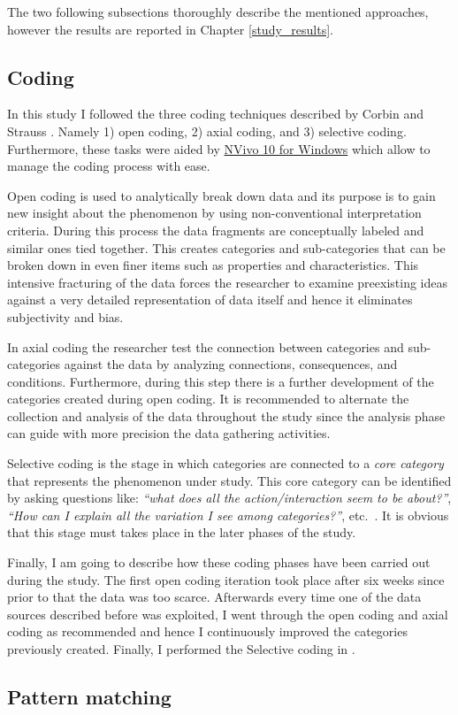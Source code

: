 The two following subsections thoroughly describe the mentioned approaches, however the results are reported in Chapter \ref{study_results}.

\subsection{Coding}
In this study I followed the three coding techniques described by Corbin and Strauss \cite{coding_guidelines}. Namely 1) open coding, 2) axial coding, and 3) selective coding. Furthermore, these tasks were aided by \href{http://www.qsrinternational.com/products_nvivo.aspx}{NVivo 10 for Windows} which allow to manage the coding process with ease.

Open coding is used to analytically break down data and its purpose is to gain new insight about the phenomenon by using non-conventional interpretation criteria. During this process the data fragments are conceptually labeled and similar ones tied together. This creates categories and sub-categories that can be broken down in even finer items such as properties and characteristics. This intensive fracturing of the data forces the researcher to examine preexisting ideas against a very detailed representation of data itself and hence it eliminates subjectivity and bias.

In axial coding the researcher test the connection between categories and sub-categories against the data by analyzing connections, consequences, and conditions. Furthermore, during this step there is a further development of the categories created during open coding. It is recommended to alternate the collection and analysis of the data throughout the study since the analysis phase can guide with more precision the data gathering activities.

Selective coding is the stage in which categories are connected to a \textit{core category} that represents the phenomenon under study. This core category can be identified by asking questions like: \textit{``what does all the action/interaction seem to be about?''}, \textit{``How can I explain all the variation I see among categories?''}, etc.\ \cite{coding_guidelines}. It is obvious that this stage must takes place in the later phases of the study.

Finally, I am going to describe how these coding phases have been carried out during the study. The first open coding iteration took place after six weeks since prior to that the data was too scarce. Afterwards every time one of the data sources described before was exploited, I went through the open coding and axial coding as recommended and hence  I continuously improved the categories previously created. Finally, I performed the Selective coding in .


\subsection{Pattern matching}